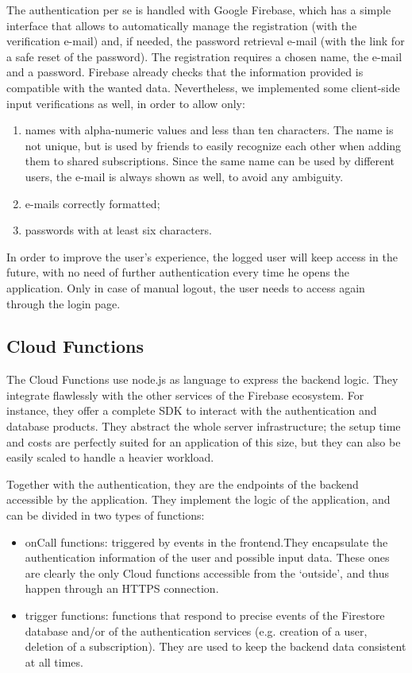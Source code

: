 \documentclass[11pt]{article}
\begin{document}
The authentication per se is handled with Google Firebase, which has a simple interface that allows to automatically manage the registration (with the verification e-mail) and, if needed, the password retrieval e-mail (with the link for a safe reset of the password). The registration requires a chosen name, the e-mail and a password. Firebase already checks that the information provided is compatible with the wanted data. Nevertheless, we implemented some client-side input verifications as well, in order to allow only:
\begin{enumerate}
    \item names with alpha-numeric values and less than ten characters. The name is not unique, but is used by friends to easily recognize each other when adding them to shared subscriptions. Since the same name can be used by different users, the e-mail is always shown as well, to avoid any ambiguity.
    \item e-mails correctly formatted;
    \item passwords with at least six characters.
\end{enumerate}

In order to improve the user's experience, the logged user will keep access in the future, with no need of further authentication every time he opens the application. Only in case of manual logout, the user needs to access again through the login page.

\subsection{Cloud Functions}
The Cloud Functions use node.js as language to express the backend logic.
They integrate flawlessly with the other services of the Firebase ecosystem. For instance, they offer a complete SDK to interact with the authentication and database products. They abstract the whole server infrastructure; the setup time and costs are perfectly suited for an application of this size, but they can also be easily scaled to handle a heavier workload.

Together with the authentication, they are the endpoints of the backend accessible by the application. They implement the logic of the application, and can be divided in two types of functions: \begin{itemize}
    \item onCall functions: triggered by events in the frontend.They encapsulate the authentication information of the user and possible input data. These ones are clearly the only Cloud functions accessible from the `outside', and thus happen through an HTTPS connection.
    \item trigger functions: functions that respond to precise events of the Firestore database and/or of the authentication services (e.g. creation of a user, deletion of a subscription). They are used to keep the backend data consistent at all times.
\end{itemize}
\end{document}
